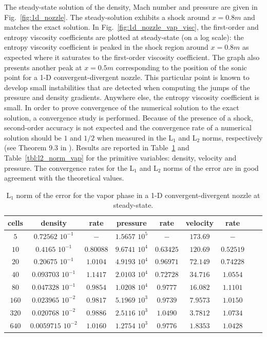 \documentclass[preprint,10pt]{elsarticle}
\newcommand{\fig}[1]{Fig.~\ref{#1}}                      %
\newcommand{\tbl}[1]{Table~\ref{#1}}                     %
\begin{document}
%
The steady-state solution of the density, Mach number and pressure are given in \fig{fig:1d_nozzle}. The steady-solution exhibits a shock around $x=0.8m$ and matches the exact solution. In \fig{fig:1d_nozzle_vap_visc}, the first-order and entropy viscosity coefficients are plotted at steady-state (on a log scale): the entropy viscosity coefficient is peaked in the shock region around $x=0.8m$ as expected where it saturates to the first-order viscosity coefficient. The graph also presents another peak at $x=0.5m$  corresponding to the position of the sonic point for a 1-D convergent-divergent nozzle. This particular point is known to develop small instabilities that are detected when computing the jumps of the pressure and density gradients. Anywhere else, the entropy  viscosity coefficient is small. In order to prove convergence of the numerical solution to the exact solution, a convergence study is performed. Because of the presence of a shock, second-order accuracy is not expected and the convergence rate of a numerical solution should be $1$ and $1/2$ when measured in the L$_1$ and L$_2$ norms, respectively (see Theorem 9.3 in \cite{convergence_book}). Results are reported in \tbl{tbl:l1_norm_vap} and \tbl{tbl:l2_norm_vap} for the primitive variables: density, velocity and pressure. The convergence rates for the L$_1$ and L$_2$ norms of the error are in good agreement with the theoretical values.
%
\begin{table}[!htbp]
\begin{center}
 \caption{\label{tbl:l1_norm_vap} L$_1$ norm of the error for the vapor phase in a 1-D convergent-divergent nozzle at steady-state.}
 \begin{tabular}{|c|c|c|c|c|c|c|c|c|}
 \hline
cells & density              & rate      & pressure          & rate      & velocity & rate      \\ \hline
$5$  & $0.72562$   $10^{-1}$ & $-$       & $1.5657$ $10^{5}$ & $-$       & $173.69$ & $-$       \\ \hline
$10$ & $0.4165$    $10^{-1}$ & $0.80088$ & $9.6741$ $10^{4}$ & $0.63425$ & $120.69$ & $0.52519$ \\ \hline
$20$ & $0.20675$   $10^{-1}$ & $1.0104$  & $4.9193$ $10^{4}$ & $0.96971$ & $72.149$ & $0.74228$ \\ \hline
$40$ & $0.093703$  $10^{-1}$ & $1.1417$  & $2.0103$ $10^{4}$ & $0.72728$ & $34.716$ & $1.0554$  \\ \hline
$80$ & $0.047328$  $10^{-1}$ & $0.9854$  & $1.0208$ $10^{4}$ & $0.9777$  & $16.082$ & $1.1101$  \\ \hline
$160$& $0.023965$  $10^{-2}$ & $0.9817$  & $5.1969$ $10^{3}$ & $0.9739$  & $7.9573$ & $1.0150$  \\ \hline
$320$& $0.020768$  $10^{-2}$ & $0.9886$  & $2.5116$ $10^{3}$ & $1.0490$  & $3.7812$ & $1.0734$  \\ \hline
$640$& $0.0059715$ $10^{-2}$ & $1.0160$  & $1.2754$ $10^{3}$ & $0.9776$  & $1.8353$ & $1.0428$  \\ \hline
\end{tabular}
\end{center}
\nonumber
\end{table}
\end{document}
